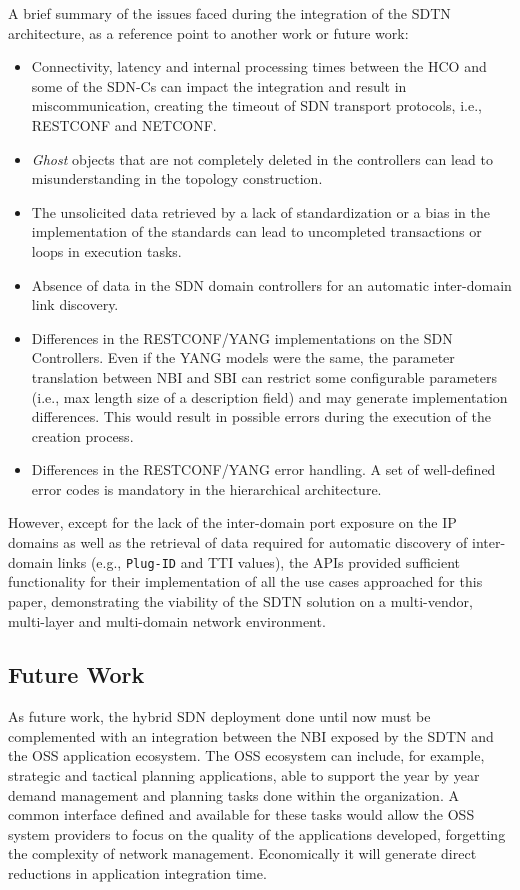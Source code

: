 \documentclass[a4paper,fleqn]{cas-dc}
\begin{document}
A brief summary of the issues faced during the integration of the SDTN architecture, as a reference point to another work or future work: 

\begin{itemize}
    \item Connectivity, latency and internal processing times between the HCO and some of the SDN-Cs can impact the integration and result in miscommunication, creating the timeout of SDN transport protocols, i.e., RESTCONF and NETCONF.  
    \item \textit{Ghost} objects that are not completely deleted in the controllers can lead to misunderstanding in the topology construction. 
    \item The unsolicited data retrieved by a lack of standardization or a bias in the implementation of the standards can lead to uncompleted transactions or loops in execution tasks.
    \item Absence of data in the SDN domain controllers for an automatic inter-domain link discovery.
    \item Differences in the RESTCONF/YANG implementations on the SDN Controllers. Even if the YANG models were the same, the parameter translation between NBI and SBI can restrict some configurable parameters (i.e., max length size of a description field) and may generate implementation differences. This would result in possible errors during the execution of the creation process.
    \item Differences in the RESTCONF/YANG error handling. A set of well-defined error codes is mandatory in the hierarchical architecture.
\end{itemize}

However, except for the lack of the inter-domain port exposure on the IP domains as well as the retrieval of data required for automatic discovery of inter-domain links (e.g., \texttt{Plug-ID} and TTI values), the APIs provided sufficient functionality for their implementation of all the use cases approached for this paper, demonstrating the viability of the SDTN solution on a multi-vendor, multi-layer and multi-domain network environment.

\subsection{Future Work}
As future work, the hybrid SDN deployment done until now must be complemented with an integration between the NBI exposed by the SDTN and the OSS application ecosystem. The OSS ecosystem can include, for example, strategic and tactical planning applications, able to support the year by year demand management and planning tasks done within the organization. A common interface defined and available for these tasks would allow the OSS system providers to focus on the quality of the applications developed, forgetting the complexity of network management. Economically it will generate direct reductions in application integration time.
\end{document}
